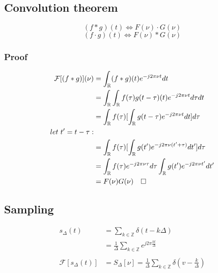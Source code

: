 \documentclass[11pt]{article}
\begin{document}
\subsection{Convolution theorem}
    $$(f*g)(t) \iff F(\nu)\cdot G(\nu)$$
    $$(f\cdot g)(t) \iff F(\nu)* G(\nu)$$
    
    \subsubsection{Proof}
        \begin{equation*}
            \begin{split}
                \mathcal{F}[(f*g)](\nu) &= \int_{\mathbb{R}} (f*g)(t)e^{-j 2 \pi \nu t}dt \\
                &= \int_{\mathbb{R}} \int_{\mathbb{R}} f(\tau)g(t-\tau)(t)e^{-j 2 \pi \nu t}d\tau dt \\
                &= \int_{\mathbb{R}}f(\tau)[\int_{\mathbb{R}}g(t-\tau)e^{-j 2 \pi \nu t}dt]d\tau \\
                let \hspace{.3em} t' = t - \tau: \\
                &= \int_{\mathbb{R}}f(\tau)[\int_{\mathbb{R}}g(t')e^{-j 2 \pi \nu (t'+\tau)}dt']d\tau \\
                &= \int_{\mathbb{R}}f(\tau)e^{-j 2 \pi \nu \tau}d\tau 
                    \int_{\mathbb{R}}g(t')e^{-j 2 \pi \nu t'}dt'  \\
                &= F(\nu)G(\nu) \hspace{1em} \square
            \end{split}
        \end{equation*}

\subsection{Sampling}
    \begin{equation*}
        \begin{split}
            s_{\Delta}(t) &= \sum_{k\in\mathbb{Z}}\delta(t-k\Delta) \\
            &= \frac{1}{\Delta}\sum_{k\in\mathbb{Z}}e^{j 2 \pi \frac{kt}{\Delta}} \\ \\
            \mathcal{F}[s_{\Delta}(t)] &= S_{\Delta}[\nu] = \frac{1}{\Delta} \sum_{k\in\mathbb{Z}}\delta(v-\frac{k}{\Delta})
        \end{split}
    \end{equation*}
	
\end{document}
